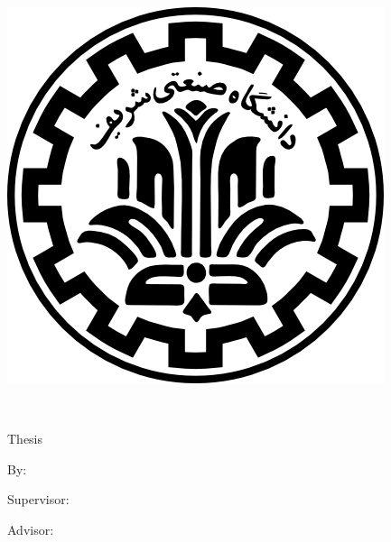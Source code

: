 
\pagestyle{empty}

\begin{center}

\begin{latin}

\includegraphics[scale=0.2]{front/template/images/logo.png}

\EnglishThesisUniversity \\
\EnglishThesisDepartment

\begin{large}
\vspace{0.7cm}
\EnglishThesisDegree{} Thesis


\vspace{1.5cm}

{\Large\textbf\EnglishThesisTitle}

\vspace{1.5cm}

{\normalsize By:}\\
\textbf{\EnglishThesisAuthor}

\vspace{1cm}

{\normalsize Supervisor:}\\ 
\textbf{\EnglishThesisSupervisor}

\vspace{1cm}

{\normalsize Advisor:}\\ 
\textbf{\EnglishThesisAdvisor}

\end{large}

\vspace{1.5cm}
\EnglishThesisDate

\end{latin}

\end{center}
